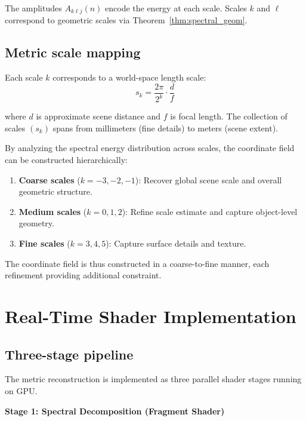 \documentclass[11pt,twocolumn,a4paper]{article}
\theoremstyle{definition}
\begin{document}
The amplitudes $A_{k\ell j}(n)$ encode the energy at each scale. Scales $k$ and $\ell$ correspond to geometric scales via Theorem~\ref{thm:spectral_geom}.

\subsection{Metric scale mapping}

Each scale $k$ corresponds to a world-space length scale:
\begin{equation}
s_k = \frac{2\pi}{2^k} \cdot \frac{d}{f}
\end{equation}

where $d$ is approximate scene distance and $f$ is focal length. The collection of scales $(s_k)$ spans from millimeters (fine details) to meters (scene extent).

By analyzing the spectral energy distribution across scales, the coordinate field can be constructed hierarchically:
\begin{enumerate}[leftmargin=1.4em]
  \item \textbf{Coarse scales} ($k = -3, -2, -1$): Recover global scene scale and overall geometric structure.
  \item \textbf{Medium scales} ($k = 0, 1, 2$): Refine scale estimate and capture object-level geometry.
  \item \textbf{Fine scales} ($k = 3, 4, 5$): Capture surface details and texture.
\end{enumerate}

The coordinate field is thus constructed in a coarse-to-fine manner, each refinement providing additional constraint.

\section{Real-Time Shader Implementation}
\label{sec:algorithm}

\subsection{Three-stage pipeline}

The metric reconstruction is implemented as three parallel shader stages running on GPU.

\textbf{Stage 1: Spectral Decomposition (Fragment Shader)}
\end{document}
